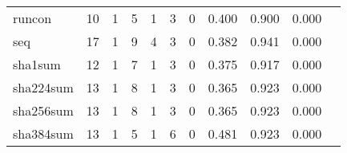 \begin{longtable}{lp{1.20cm}p{1.20cm}p{1.20cm}p{1.20cm}p{1.20cm}p{1.20cm}p{1.20cm}p{1.20cm}p{1.20cm}p{1.20cm}}
runcon    &                                    10 &                                                  1 &                                                  5 &                                                  1 &                                                  3 &                                                  0 &                                         0.400 &                                              0.900 &                                              0.000 \\
seq       &                                    17 &                                                  1 &                                                  9 &                                                  4 &                                                  3 &                                                  0 &                                         0.382 &                                              0.941 &                                              0.000 \\
sha1sum   &                                    12 &                                                  1 &                                                  7 &                                                  1 &                                                  3 &                                                  0 &                                         0.375 &                                              0.917 &                                              0.000 \\
sha224sum &                                    13 &                                                  1 &                                                  8 &                                                  1 &                                                  3 &                                                  0 &                                         0.365 &                                              0.923 &                                              0.000 \\
sha256sum &                                    13 &                                                  1 &                                                  8 &                                                  1 &                                                  3 &                                                  0 &                                         0.365 &                                              0.923 &                                              0.000 \\
sha384sum &                                    13 &                                                  1 &                                                  5 &                                                  1 &                                                  6 &                                                  0 &                                         0.481 &                                              0.923 &                                              0.000 \\

\end{longtable}
